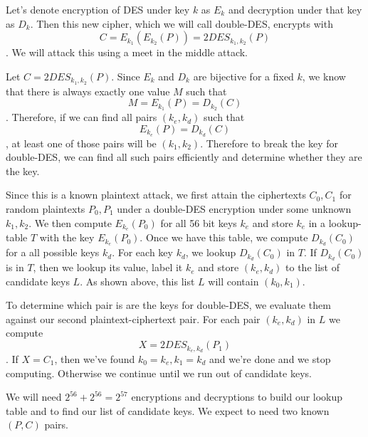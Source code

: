 Let's denote encryption of DES under key $k$ as $E_k$ and decryption under that key as
$D_k$. Then this new cipher, which we will call double-DES, encrypts with \[C =
E_{k_1}(E_{k_2}(P)) = 2DES_{k_1,k_2}(P)\]. We will attack this using a meet in the middle
attack. 

Let $C = 2DES_{k_1, k_2}(P)$. Since $E_k$ and $D_k$ are bijective for a fixed $k$, we know
that there is always exactly one value $M$ such that \[M = E_{k_1}(P) = D_{k_2}(C)\].
Therefore, if we can find all pairs $(k_e, k_d)$ such that \[E_{k_e}(P) = D_{k_d}(C)\], at
least one of those pairs will be $(k_1, k_2)$. Therefore to break the key for double-DES,
we can find all such pairs efficiently and determine whether they are the key. 

Since this is a known plaintext attack, we first attain the ciphertexts $C_0, C_1$ for
random plaintexts $P_0, P_1$ under a double-DES encryption under some unknown $k_1, k_2$.
We then compute $E_{k_e}(P_0)$ for all 56 bit keys $k_e$ and store $k_e$ in a lookup-table
$T$ with the key $E_{k_e}(P_0)$. Once we have this table, we compute $D_{k_d}(C_0)$ for a
all possible keys $k_d$. For each key $k_d$, we lookup $D_{k_d}(C_0)$ in $T$. If
$D_{k_d}(C_0)$ is in $T$, then we lookup its value, label it $k_e$ and store $(k_e, k_d)$
to the list of candidate keys $L$. As shown above, this list $L$ will contain $(k_0,
k_1)$.

To determine which pair is are the keys for double-DES, we evaluate them against our
second plaintext-ciphertext pair. For each pair $(k_e, k_d)$ in $L$ we compute \[X =
2DES_{k_e, k_d}(P_1)\]. If $X = C_1$, then we've found $k_0 = k_e, k_1 = k_d$ and we're
done and we stop computing. Otherwise we continue until we run out of candidate keys. 

We will need $2^{56} + 2^{56} = 2^{57}$ encryptions and decryptions to build our lookup
table and to find our list of candidate keys. We expect to need two known $(P,C)$ pairs. 
